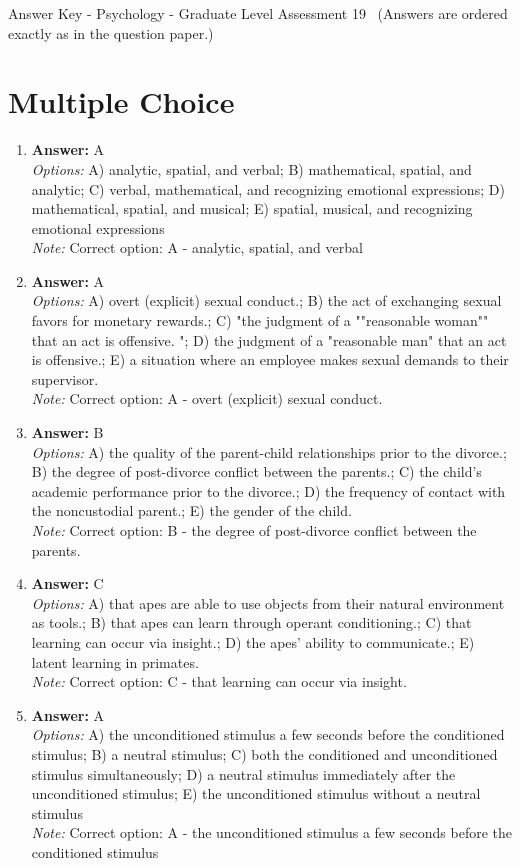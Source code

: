 \documentclass[12pt]{article}
\begin{document}
\begin{center}
Answer Key - Psychology - Graduate Level Assessment 19 \
\small (Answers are ordered exactly as in the question paper.)
\end{center}

\section*{Multiple Choice}
\begin{enumerate}[label=\arabic*.]
\item \textbf{Answer:} A
\\ \textit{Options:} A) analytic, spatial, and verbal; B) mathematical, spatial, and analytic; C) verbal, mathematical, and recognizing emotional expressions; D) mathematical, spatial, and musical; E) spatial, musical, and recognizing emotional expressions
\\ \textit{Note:} Correct option: A - analytic, spatial, and verbal
\item \textbf{Answer:} A
\\ \textit{Options:} A) overt (explicit) sexual conduct.; B) the act of exchanging sexual favors for monetary rewards.; C) "the judgment of a ""reasonable woman"" that an act is offensive. "; D) the judgment of a "reasonable man" that an act is offensive.; E) a situation where an employee makes sexual demands to their supervisor.
\\ \textit{Note:} Correct option: A - overt (explicit) sexual conduct.
\item \textbf{Answer:} B
\\ \textit{Options:} A) the quality of the parent-child relationships prior to the divorce.; B) the degree of post-divorce conflict between the parents.; C) the child's academic performance prior to the divorce.; D) the frequency of contact with the noncustodial parent.; E) the gender of the child.
\\ \textit{Note:} Correct option: B - the degree of post-divorce conflict between the parents.
\item \textbf{Answer:} C
\\ \textit{Options:} A) that apes are able to use objects from their natural environment as tools.; B) that apes can learn through operant conditioning.; C) that learning can occur via insight.; D) the apes' ability to communicate.; E) latent learning in primates.
\\ \textit{Note:} Correct option: C - that learning can occur via insight.
\item \textbf{Answer:} A
\\ \textit{Options:} A) the unconditioned stimulus a few seconds before the conditioned stimulus; B) a neutral stimulus; C) both the conditioned and unconditioned stimulus simultaneously; D) a neutral stimulus immediately after the unconditioned stimulus; E) the unconditioned stimulus without a neutral stimulus
\\ \textit{Note:} Correct option: A - the unconditioned stimulus a few seconds before the conditioned stimulus
\end{enumerate}
\end{document}

